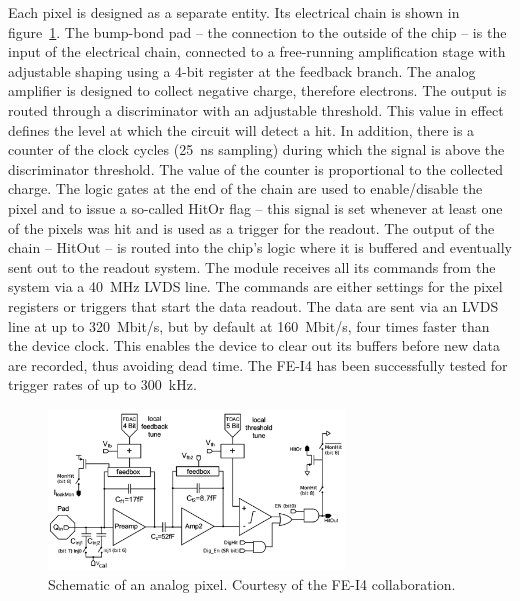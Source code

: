\documentclass[12pt]{packages/mytustyle}  %
\begin{document}
Each pixel is designed as a separate entity. Its electrical chain is shown in figure~\ref{fig:anapix}. The bump-bond pad -- the connection to the outside of the chip -- is the input of the electrical chain, connected to a free-running amplification stage with adjustable shaping using a 4-bit register at the feedback branch. The analog amplifier is designed to collect negative charge, therefore electrons. The output is routed through a discriminator with an adjustable threshold. This value in effect defines the level at which the circuit will detect a hit. In addition, there is a counter of the clock cycles (25~ns sampling) during which the signal is above the discriminator threshold. The value of the counter is proportional to the collected charge. The logic gates at the end of the chain are used to enable/disable the pixel and to issue a so-called HitOr flag -- this signal is set whenever at least one of the pixels was hit and is used as a trigger for the readout. The output of the chain -- HitOut -- is routed into the chip's logic where it is buffered and eventually sent out to the readout system. The module receives all its commands from the system via a 40~MHz LVDS line. The commands are either settings for the pixel registers or triggers that start the data readout. The data are sent via an LVDS line at up to 320~Mbit/s, but by default at 160~Mbit/s, four times faster than the device clock. This enables the device to clear out its buffers before new data are recorded, thus avoiding dead time. The FE-I4 has been successfully tested for trigger rates of up to 300~kHz. 

\begin{figure}[!t]
\centering
\includegraphics[width=0.7\textwidth]{pics/analogPix}
\caption{Schematic of an analog pixel. Courtesy of the FE-I4 collaboration.}
\label{fig:anapix}
\end{figure}
\end{document}
